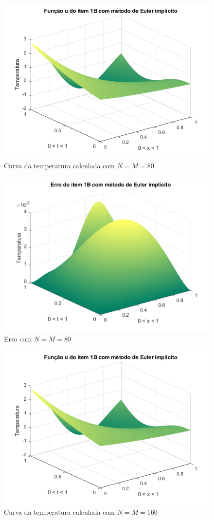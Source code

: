\documentclass[12pt]{article}
\begin{document}
\begin{spacing}{1.5}
\begin{figure}
    \centering
    \includegraphics[width=0.8\linewidth]{Segunda_Tarefa/ItemB/nm80_calculada_B.png}
    \caption{Curva da temperatura calculada com $N=M=80$}
    \label{fig:BB_nm80_calculada}
\end{figure}

\begin{figure}
    \centering
    \includegraphics[width=0.8\linewidth]{Segunda_Tarefa/ItemB/nm80_erro_B.png}
    \caption{Erro com $N=M=80$}
    \label{fig:BB_nm80_erro}
\end{figure}

\begin{figure}
    \centering
    \includegraphics[width=0.8\linewidth]{Segunda_Tarefa/ItemB/nm160_calculada_B.png}
    \caption{Curva da temperatura calculada com $N=M=160$}
    \label{fig:BB_nm160_calculada}
\end{figure}


\end{spacing}
\end{document}
